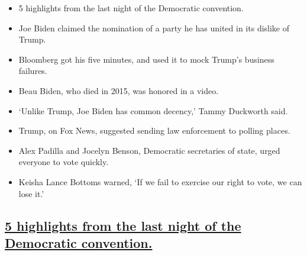 \begin{itemize}
\item
  \protect\hyperlink{5-highlights-from-the-last-night-of-the-democratic-convention}{}

  5 highlights from the last night of the Democratic convention.
\item
  \protect\hyperlink{joe-biden-claimed-the-nomination-of-a-party-he-has-united-in-its-dislike-of-trump}{}

  Joe Biden claimed the nomination of a party he has united in its
  dislike of Trump.
\item
  \protect\hyperlink{bloomberg-got-his-five-minutes-and-used-it-to-mock-trumps-business-failures}{}

  Bloomberg got his five minutes, and used it to mock Trump's business
  failures.
\item
  \protect\hyperlink{beau-biden-who-died-in-2015-was-honored-in-a-video}{}

  Beau Biden, who died in 2015, was honored in a video.
\item
  \protect\hyperlink{unlike-trump-joe-biden-has-common-decency-tammy-duckworth-said}{}

  `Unlike Trump, Joe Biden has common decency,' Tammy Duckworth said.
\item
  \protect\hyperlink{trump-on-fox-news-suggested-sending-law-enforcement-to-polling-places}{}

  Trump, on Fox News, suggested sending law enforcement to polling
  places.
\item
  \protect\hyperlink{alex-padilla-and-jocelyn-benson-democratic-secretaries-of-state-urged-everyone-to-vote-quickly}{}

  Alex Padilla and Jocelyn Benson, Democratic secretaries of state,
  urged everyone to vote quickly.
\item
  \protect\hyperlink{keisha-lance-bottoms-warned-if-we-fail-to-exercise-our-right-to-vote-we-can-lose-it}{}

  Keisha Lance Bottoms warned, `If we fail to exercise our right to
  vote, we can lose it.'
\end{itemize}

\hypertarget{5-highlights-from-the-last-night-of-the-democratic-convention}{%
\subsection{\texorpdfstring{\protect\hyperlink{5-highlights-from-the-last-night-of-the-democratic-convention}{5
highlights from the last night of the Democratic
convention.}}{5 highlights from the last night of the Democratic convention.}}\label{5-highlights-from-the-last-night-of-the-democratic-convention}}

